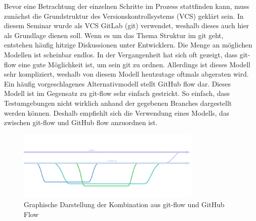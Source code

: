 Bevor eine Betrachtung der einzelnen Schritte im Prozess stattfinden kann, muss zunächst die Grundstruktur des Versionskontrollsystems (VCS) geklärt sein.
In diesem Seminar wurde als VCS GitLab (git) verwendet, weshalb dieses auch hier als Grundlage dienen soll.
Wenn es um das Thema Struktur im git geht, entstehen häufig hitzige Diskussionen unter Entwicklern.
Die Menge an möglichen Modellen ist scheinbar endlos.
In der Vergangenheit hat sich oft gezeigt, dass git-flow\cite{SuccessfulGitBranching} eine gute Möglichkeit ist, um sein git zu ordnen.
Allerdings ist dieses Modell sehr kompliziert, weshalb von diesem Modell heutzutage oftmals abgeraten wird.
Ein häufig vorgeschlagenes Alternativmodell stellt GitHub flow\cite{UnderstandingGitHubFlow} dar.
Dieses Modell ist im Gegensatz zu git-flow sehr einfach gestrickt.
So einfach, dass Testumgebungen nicht wirklich anhand der gegebenen Branches dargestellt werden können.
Deshalb empfiehlt sich die Verwendung eines Modells, das zwischen git-flow und GitHub flow anzuordnen ist.
\begin{figure}[H]
    \includegraphics[width=0.8\textwidth]{img/branching}
    \centering
    \caption{Graphische Darstellung der Kombination aus git-flow und GitHub Flow}
    \label{fig:branchingModel}
\end{figure}

